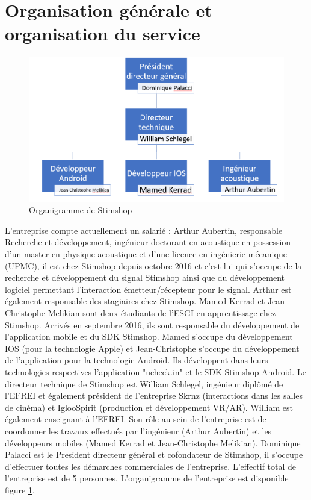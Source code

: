 \documentclass[12pt]{report}
\begin{document}
	\section{Organisation générale et organisation du service}

\begin{figure}[h!]
\begin{center}
\includegraphics[scale=0.5]{organigramme.PNG}
\end{center}
\caption{Organigramme de Stimshop}
\label{Organigramme de Stimshop}
\end{figure}

L'entreprise compte actuellement un salarié : Arthur Aubertin, responsable Recherche et développement, ingénieur doctorant en acoustique en possession d'un master en physique acoustique et d'une licence en ingénierie mécanique (UPMC), il est chez Stimshop depuis octobre 2016 et c'est lui qui s'occupe de la recherche et développement du signal Stimshop ainsi que du développement logiciel permettant l'interaction émetteur/récepteur pour le signal. Arthur est également responsable des stagiaires chez Stimshop. Mamed Kerrad et Jean-Christophe Melikian sont deux étudiants de l'ESGI en apprentissage chez Stimshop. Arrivés en septembre 2016, ils sont responsable du développement de l'application mobile et du SDK Stimshop. Mamed s'occupe du développement IOS (pour la technologie Apple) et Jean-Christophe s'occupe du développement de l'application pour la technologie Android. Ils développent dans leurs technologies respectives l'application "ucheck.in" et le SDK Stimshop Android. Le directeur technique de Stimshop est William Schlegel, ingénieur diplômé de l'EFREI et également président de l'entreprise Skrnz (interactions dans les salles de cinéma) et IglooSpirit (production et développement VR/AR). William est également enseignant à l'EFREI. Son rôle au sein de l'entreprise est de coordonner les travaux effectués par l'ingénieur (Arthur Aubertin) et les développeurs mobiles (Mamed Kerrad et Jean-Christophe Melikian). Dominique Palacci est le President directeur général et cofondateur de Stimshop, il s'occupe d'effectuer toutes les démarches commerciales de l'entreprise. L'effectif total de l'entreprise est de 5 personnes. L'organigramme de l'entreprise est disponible figure \ref{Organigramme de Stimshop}.
\end{document}
